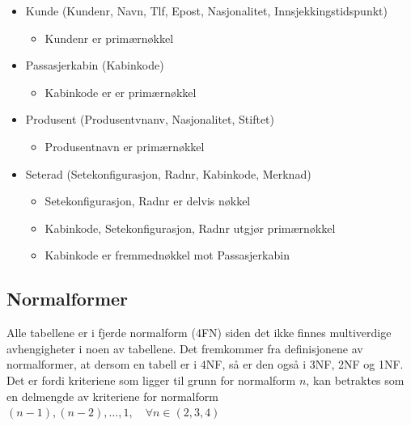 \documentclass[a4paper,12pt]{article}
\begin{document}
\begin{itemize}
\item Kunde (Kundenr, Navn, Tlf, Epost, Nasjonalitet, Innsjekkingstidspunkt)
\begin{itemize}
\item Kundenr er primærnøkkel
\end{itemize}

\item Passasjerkabin (Kabinkode)
\begin{itemize}
\item Kabinkode er er primærnøkkel
\end{itemize}

\item Produsent (Produsentvnanv, Nasjonalitet, Stiftet)
\begin{itemize}
\item Produsentnavn er primærnøkkel
\end{itemize}

\item Seterad (Setekonfigurasjon, Radnr, Kabinkode, Merknad)
\begin{itemize}
\item Setekonfigurasjon, Radnr er delvis nøkkel
\item Kabinkode, Setekonfigurasjon, Radnr utgjør primærnøkkel
\item Kabinkode er fremmednøkkel mot Passasjerkabin 
\end{itemize}

\end{itemize}

\subsection{Normalformer}
Alle tabellene er i fjerde normalform (4FN) siden det ikke finnes
multiverdige avhengigheter i noen av tabellene. Det fremkommer fra definisjonene
av normalformer, at dersom en tabell er i 4NF, så er den også i 3NF, 2NF og 1NF.
Det er fordi kriteriene som ligger til grunn for normalform $n$, kan betraktes
som en delmengde av kriteriene for normalform $(n-1), (n-2), \ldots, 1, \quad \forall
n \in (2,3,4)$
\end{document}

